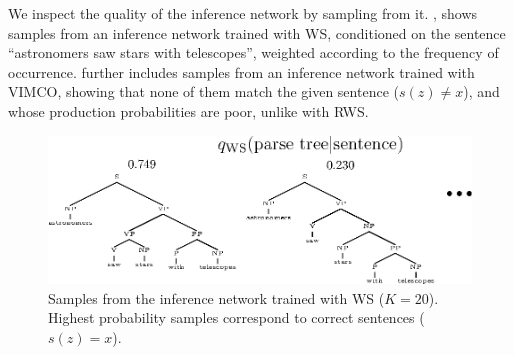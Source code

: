 We inspect the quality of the inference network by sampling from it.
, shows samples from an inference network trained with \gls{WS}, conditioned on the sentence ``astronomers saw stars with telescopes'', weighted according to the frequency of occurrence.
 further includes samples from an inference network trained with \gls{VIMCO}, showing that none of them match the given sentence ($s(z) \neq x$), and whose production probabilities are poor, unlike with \gls{RWS}.

\begin{figure}[t]
  \centering
  \includegraphics[width=0.95\linewidth]{figures/RRWS/pcfg/ws_q_samples.eps}
  \caption{
    Samples from the inference network trained with \gls{WS} ($K = 20$).
    Highest probability samples correspond to correct sentences ($s(z) = x$).
  }
  \label{fig:experiments/pcfg/ws_q_samples}
  \vspace*{-2ex}
\end{figure}



